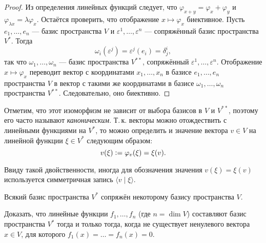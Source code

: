 \begin{proof}
    Из определения линейных функций следует, что $\varphi_{x + y} = \varphi_x + \varphi_y$ и $\varphi_{\lambda x} = \lambda\varphi_x$. Остаётся проверить, что отображение $x \mapsto \varphi_x$ биективное. Пусть $e_1, \ldots, e_n$ --- базис пространства $V$ и $\varepsilon^1, \ldots, \varepsilon^n$ --- сопряжённый базис пространства $V^\ast$. Тогда
    \[
        \omega_i(\varepsilon^j) = \varepsilon^j(e_i) = \delta^i_j,
    \]
    так что $\omega_1, \ldots, \omega_n$ --- базис пространства $V^{\ast\ast}$, сопряжённый $\varepsilon^1, \ldots, \varepsilon^n$. Отображение $x \mapsto \varphi_x$ переводит вектор с координатами $x_1, \ldots, x_n$ в базисе $e_1, \ldots, e_n$ пространства $V$ в вектор с такими же координатами в базисе $\omega_1, \ldots, \omega_n$ пространства $V^{\ast\ast}$. Следовательно, оно биективно.
\end{proof}

Отметим, что этот изоморфизм не зависит от выбора базисов в $V$ и $V^{\ast\ast}$, поэтому его часто называют \textit{каноническим}. Т.\,к. векторы можно отождествить с линейными функциями на $V^\ast$, то можно определить и значение вектора $v \in V$ на линейной функции $\xi \in V^\ast$ следующим образом:
\[
    v(\xi) \vcentcolon = \varphi_v(\xi) = \xi(v).
\]

Ввиду такой двойственности, иногда для обозначения значения $v(\xi) = \xi(v)$ используется симметричная запись $\langle v \mid \xi\rangle$.

\begin{corollary}
    Всякий базис пространства $V^\ast$ сопряжён некоторому базису пространства $V$.
\end{corollary}

\begin{problem}[Из Винберга]
    Доказать, что линейные функции $f_1, \ldots, f_n$ (где $n = \dim V$) составляют базис пространства $V^\ast$ тогда и только тогда, когда не существует ненулевого вектора $x \in V$, для которого $f_1(x) = \ldots = f_n(x) = 0$.
\end{problem}

